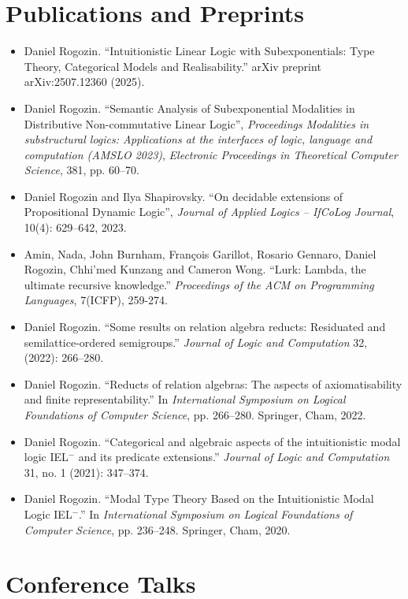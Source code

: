 \documentclass[10pt,a4paper]{article}
\begin{document}
\section{Publications and Preprints}

\begin{itemize}[leftmargin=*]
    \item Daniel Rogozin. ``Intuitionistic Linear Logic with Subexponentials: Type Theory, Categorical Models and Realisability.'' arXiv preprint arXiv:2507.12360 (2025).
    \item Daniel Rogozin. ``Semantic Analysis of Subexponential Modalities in Distributive Non-commutative Linear Logic'', \emph{Proceedings Modalities in substructural logics: Applications at the interfaces of logic, language and computation (AMSLO 2023)}, \emph{Electronic Proceedings in Theoretical Computer Science}, 381, pp. 60–70.
    \item Daniel Rogozin and Ilya Shapirovsky. ``On decidable extensions of Propositional Dynamic Logic'', \emph{Journal of Applied Logics – IfCoLog Journal}, 10(4): 629–642, 2023.
    \item Amin, Nada, John Burnham, François Garillot, Rosario Gennaro, Daniel Rogozin, Chhi'med Kunzang and Cameron Wong. ``Lurk: Lambda, the ultimate recursive knowledge.'' \emph{Proceedings of the ACM on Programming Languages}, 7(ICFP), 259-274.
    \item Daniel Rogozin. ``Some results on relation algebra reducts: Residuated and semilattice-ordered semigroups.'' \textit{Journal of Logic and Computation} 32, (2022): 266--280.
    \item Daniel Rogozin. ``Reducts of relation algebras: The aspects of axiomatisability and finite representability.'' In \textit{International Symposium on Logical Foundations of Computer Science}, pp. 266--280. Springer, Cham, 2022.
    \item Daniel Rogozin. ``Categorical and algebraic aspects of the intuitionistic modal logic IEL$^-$ and its predicate extensions.'' \textit{Journal of Logic and Computation} 31, no. 1 (2021): 347--374.
    \item Daniel Rogozin. ``Modal Type Theory Based on the Intuitionistic Modal Logic IEL$^-$.'' In \textit{International Symposium on Logical Foundations of Computer Science}, pp. 236--248. Springer, Cham, 2020.
\end{itemize}


\section{Conference Talks}
\end{document}
